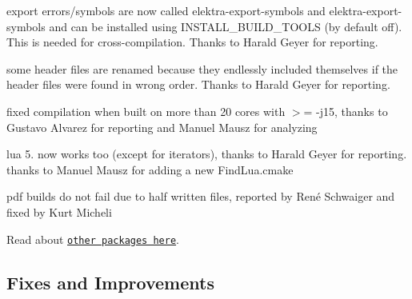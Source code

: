 \begin{DoxyItemize}
\item export errors/symbols are now called {\ttfamily elektra-\/export-\/symbols} and {\ttfamily elektra-\/export-\/symbols} and can be installed using {\ttfamily I\+N\+S\+T\+A\+L\+L\+\_\+\+B\+U\+I\+L\+D\+\_\+\+T\+O\+O\+LS} (by default off). This is needed for cross-\/compilation. Thanks to Harald Geyer for reporting.
\item some header files are renamed because they endlessly included themselves if the header files were found in wrong order. Thanks to Harald Geyer for reporting.
\item fixed compilation when built on more than 20 cores with $>$= -\/j15, thanks to Gustavo Alvarez for reporting and Manuel Mausz for analyzing
\item lua 5. now works too (except for iterators), thanks to Harald Geyer for reporting. thanks to Manuel Mausz for adding a new Find\+Lua.\+cmake
\item pdf builds do not fail due to half written files, reported by René Schwaiger and fixed by Kurt Micheli
\end{DoxyItemize}

Read about \href{https://github.com/ElektraInitiative/libelektra#packages}{\tt other packages here}.

\subsection*{Fixes and Improvements}


